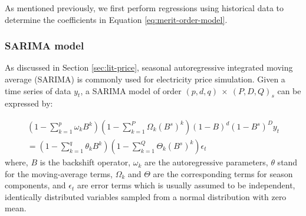 





As mentioned previously, we first perform regressions using historical data to determine the coefficients in Equation \eqref{eq:merit-order-model}. 

\subsubsection{SARIMA model}

As discussed in Section \ref{sec:lit-price}, seasonal autoregressive integrated moving average (SARIMA) is commonly used for electricity price simulation. Given a time series of data $y_t$, a SARIMA model of order $(p,d,q)~\times~(P,D,Q)_s$ can be expressed by:

\begin{multline*}
(1 - \sum_{k=1}^{p}\omega _k B^k)(1 - \sum_{k=1}^{P} \Omega _k {(B^s)}^k)(1-B)^d(1-B^s)^D y_t \\
= (1-\sum_{k=1}^{q}\theta _k B^k) (1 - \sum_{k=1}^{Q} \Theta _k {(B^s)}^k)\epsilon_t
\end{multline*}
where, $B$ is the backshift operator, $\omega_k$ are the autoregressive parameters, $\theta$ stand for the moving-average terms, $\Omega_k$ and $\Theta$ are the corresponding terms for season components, and $\epsilon_t$ are error terms which is usually assumed to be independent, identically distributed variables sampled from a normal distribution with zero mean. 

